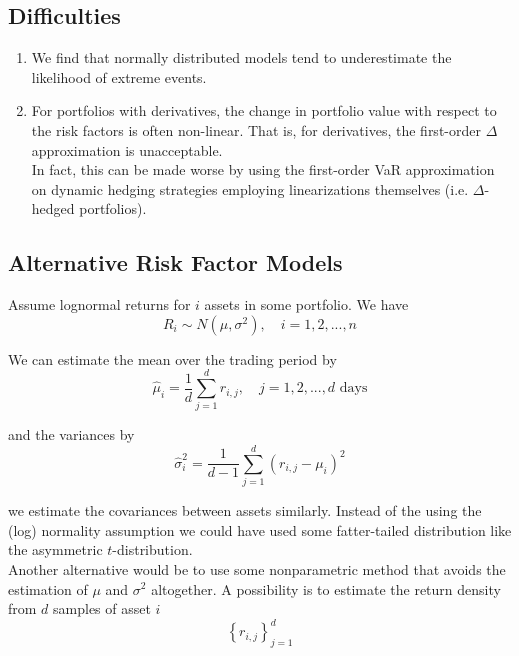 \documentclass[12pt]{article}
\newlength\tindent
\renewcommand{\indent}{\hspace*{\tindent}}
\begin{document}
\subsection{Difficulties}

\begin{enumerate}
	\item We find that normally distributed models tend to underestimate the likelihood of extreme events. 

	\item For portfolios with derivatives, the change in portfolio value with respect to the risk factors is often non-linear. That is, for derivatives, the first-order $\Delta$ approximation is unacceptable. \\
	
	In fact, this can be made worse by using the first-order VaR approximation on dynamic hedging strategies employing linearizations themselves (i.e. $\Delta$-hedged portfolios).	
\end{enumerate}

\subsection{Alternative Risk Factor Models}

Assume lognormal returns for $i$ assets in some portfolio. We have
\begin{equation*}
	R_i \sim N(\mu, \sigma^2), \quad i=1,2,...,n
\end{equation*}

We can estimate the mean over the trading period by
\begin{equation*}
	\hat{\mu}_i = \frac{1}{d} \sum^d_{j = 1} r_{i,j}, \quad j = 1,2,..., d \text{ days}
\end{equation*}

and the variances by
\begin{equation*}
	\hat{\sigma}^2_i = \frac{1}{d - 1} \sum^d_{j = 1} (r_{i,j} - \mu_i)^2
\end{equation*}

we estimate the covariances between assets similarly. Instead of the using the (log) normality assumption we could have used some fatter-tailed distribution like the asymmetric $t$-distribution. \\

\indent Another alternative would be to use some nonparametric method that avoids the estimation of $\mu$ and $\sigma^2$ altogether. A possibility is to estimate the return density from $d$ samples of asset $i$
\begin{equation*}
	\left\{ r_{i,j} \right\}^d_{j = 1}
\end{equation*}	
\end{document}
